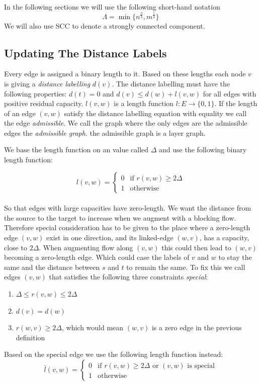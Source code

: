 In the following sections we will use the following short-hand notation $$\Lambda = \min{\{n^{\frac{2}{3}},m^{\frac{1}{2}}\}}$$
We will also use SCC to denote a strongly connected component.

\subsection{Updating The Distance Labels} \label{GR-Parts-Start}
Every edge is assigned a binary length to it. Based on these lengths each node $v$ is giving a \emph{distance labelling} $d(v)$. The distance labelling
must have the following properties: $d(t) = 0$ and $d(v) \leq d(w) + l(v,w)$ for all edges with positive residual capacity.
$l(v,w)$ is a length function $l: E \to \{0,1\}$. If the length of an edge $(v,w)$ satisfy the distance labelling equation with equality we call the edge \emph{admissible}.
We call the graph where the only edges are the admissible edges the \emph{admissible graph}. the admissible graph is a layer graph.

We base the length function on an value called $\Delta$ and use the following binary length function:

$$ l(v,w) =
  \begin{cases}
   0 & \text{if } r(v,w) \geq 2\Delta \\
   1       & \text{otherwise}
  \end{cases}$$\\
So that edges with large capacities have zero-length. We want the distance from the source to the target to increase when we augment with a blocking flow.
Therefore special consideration has to be given to the place where a zero-length edge $(v,w)$ exist in one direction, and its linked-edge $(w,v)$, 
has a capacity, close to $2\Delta$. When augmenting flow along $(v,w)$ this could then lead to $(w,v)$ becoming a
zero-length edge. Which could case the labels of $v$ and $w$ to stay the same and the distance between $s$ and $t$ to remain the same. To fix this we call edges $(v,w)$ that satisfies
the following three constraints \emph{special}:
\begin{enumerate}
	\item $\Delta \leq r(v,w) \leq 2\Delta$
	\item $d(v) = d(w)$
	\item $r(w,v) \geq 2\Delta$, which would mean $(w,v)$ is a zero edge in the previous definition
\end{enumerate}
Based on the special edge we use the following length function instead:
$$ \bar{l}(v,w) =
  \begin{cases}
   0 & \text{if } r(v,w) \geq 2\Delta \text{ or } (v,w) \text{ is special}\\
   1       & \text{otherwise}
  \end{cases}$$\\

